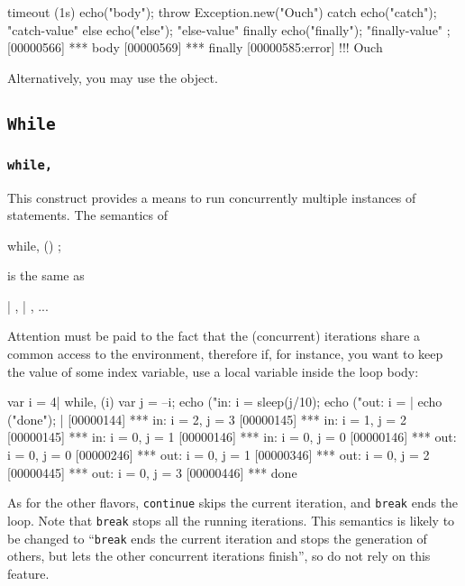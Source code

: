 \begin{urbiscript}
timeout (1s)  { echo("body"); throw Exception.new("Ouch") }
catch         { echo("catch"); "catch-value" }
else          { echo("else"); "else-value" }
finally       { echo("finally"); "finally-value" };
[00000566] *** body
[00000569] *** finally
[00000585:error] !!! Ouch
\end{urbiscript}

Alternatively, you may use the  object.

\subsection{\lstinline{While}}
\subsubsection{\lstinline{while,}}
\label{sec:lang:while:comma}
\experimentalremoved{}

This construct provides a means to run concurrently multiple instances
of statements.  The semantics of

\begin{urbiunchecked}
while, ()
  ;
\end{urbiunchecked}

\noindent
is the same as

\begin{urbiunchecked}
 |  ,  |  , ...
\end{urbiunchecked}

Attention must be paid to the fact that the (concurrent) iterations
share a common access to the environment, therefore if, for instance,
you want to keep the value of some index variable, use a local
variable inside the loop body:

\begin{urbiscript}[firstnumber=1]
{
  var i = 4|
  while, (i)
  {
    var j = --i;
    echo ("in: i = %
    sleep(j/10);
    echo ("out: i = %
  }|
  echo ("done");
}|
[00000144] *** in: i = 2, j = 3
[00000145] *** in: i = 1, j = 2
[00000145] *** in: i = 0, j = 1
[00000146] *** in: i = 0, j = 0
[00000146] *** out: i = 0, j = 0
[00000246] *** out: i = 0, j = 1
[00000346] *** out: i = 0, j = 2
[00000445] *** out: i = 0, j = 3
[00000446] *** done
\end{urbiscript}

As for the other flavors, \lstinline{continue} skips the current iteration,
and \lstinline{break} ends the loop.  Note that \lstinline{break} stops all
the running iterations.  This semantics is likely to be changed to
``\lstinline{break} ends the current iteration and stops the generation of
others, but lets the other concurrent iterations finish'', so do not rely on
this feature.

